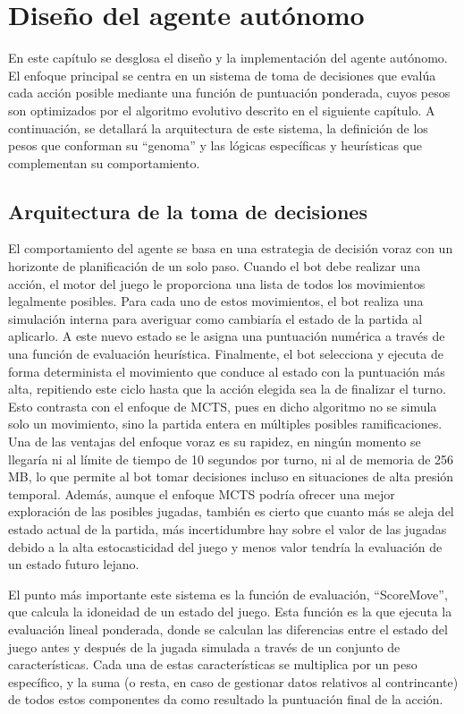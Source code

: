 \chapter{Diseño del agente autónomo} \label{chap:software_bot}

En este capítulo se desglosa el diseño y la implementación del agente autónomo. El enfoque principal se centra en un sistema de toma de decisiones que evalúa cada acción posible mediante una función de puntuación ponderada, cuyos pesos son optimizados por el algoritmo evolutivo descrito en el siguiente capítulo. A continuación, se detallará la arquitectura de este sistema, la definición de los pesos que conforman su ``genoma'' y las lógicas específicas y heurísticas que complementan su comportamiento.

\section{Arquitectura de la toma de decisiones} \label{sec:arquitectura_toma_decisiones}

El comportamiento del agente se basa en una estrategia de decisión voraz con un horizonte de planificación de un solo paso. Cuando el bot debe realizar una acción, el motor del juego le proporciona una lista de todos los movimientos legalmente posibles. Para cada uno de estos movimientos, el bot realiza una simulación interna para averiguar como cambiaría el estado de la partida al aplicarlo. A este nuevo estado se le asigna una puntuación numérica a través de una función de evaluación heurística. Finalmente, el bot selecciona y ejecuta de forma determinista el movimiento que conduce al estado con la puntuación más alta, repitiendo este ciclo hasta que la acción elegida sea la de finalizar el turno. Esto contrasta con el enfoque de MCTS, pues en dicho algoritmo no se simula solo un movimiento, sino la partida entera en múltiples posibles ramificaciones. Una de las ventajas del enfoque voraz es su rapidez, en ningún momento se llegaría ni al límite de tiempo de 10 segundos por turno, ni al de memoria de 256 MB, lo que permite al bot tomar decisiones incluso en situaciones de alta presión temporal. Además, aunque el enfoque MCTS podría ofrecer una mejor exploración de las posibles jugadas, también es cierto que cuanto más se aleja del estado actual de la partida, más incertidumbre hay sobre el valor de las jugadas debido a la alta estocasticidad del juego y menos valor tendría la evaluación de un estado futuro lejano.

El punto más importante este sistema es la función de evaluación, ``ScoreMove'', que calcula la idoneidad de un estado del juego. Esta función es la que ejecuta la evaluación lineal ponderada, donde se calculan las diferencias entre el estado del juego antes y después de la jugada simulada a través de un conjunto de características. Cada una de estas características se multiplica por un peso específico, y la suma (o resta, en caso de gestionar datos relativos al contrincante) de todos estos componentes da como resultado la puntuación final de la acción.

